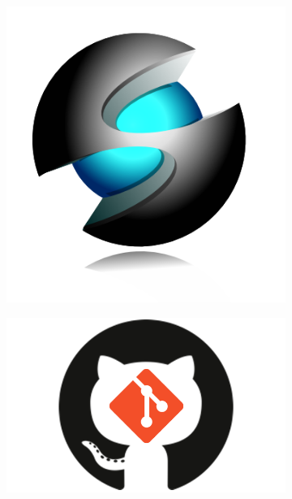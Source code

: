 \documentclass[12pt]{article}
\begin{document}
 \titlepage{}

\begin{figure} \centering
	\begin{subfigure}{0.15\textwidth} \flushleft{}
		\includegraphics[width=\linewidth]{foss_logo}
	\end{subfigure}%
		\begin{subfigure}{0.4\textwidth} \centering
		\includegraphics[width=\linewidth]{git_github}
	\end{subfigure}%
		\begin{subfigure}{0.15\textwidth} \flushright{}

\end{subfigure}
\end{figure}
\end{document}
